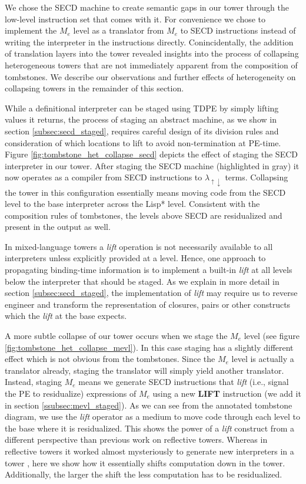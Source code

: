 \documentclass[a4paper,12pt,twoside,openright]{report}
\theoremstyle{definition}
\newcommand{\mslang}{$\lambda_{\uparrow\downarrow}$}
\newcommand{\mevl}{$M_{e}$}
\begin{document}
We chose the SECD machine to create semantic gaps in our tower through the low-level instruction set that comes with it. For convenience we chose to implement the \mevl{} level as a translator from \mevl{} to SECD instructions instead of writing the interpreter in the instructions directly. Conincidentally, the addition of translation layers into the tower revealed insights into the process of collapsing heterogeneous towers that are not immediately apparent from the composition of tombstones. We describe our observations and further effects of heterogeneity on collapsing towers in the remainder of this section.

While a definitional interpreter can be staged using TDPE by simply lifting values it returns, the process of staging an abstract machine, as we show in section \ref{subsec:secd_staged}, requires careful design of its division rules and consideration of which locations to lift to avoid non-termination at PE-time. Figure \ref{fig:tombstone_het_collapse_secd} depicts the effect of staging the SECD interpreter in our tower. After staging the SECD machine (highlighted in gray) it now operates as a compiler from SECD instructions to \mslang{} terms. Collapsing the tower in this configuration essentially means moving code from the SECD level to the base interpreter across the Lisp* level. Consistent with the composition rules of tombstones, the levels above SECD are residualized and present in the output as well.

In mixed-language towers a \textit{lift} operation is not necessarily available to all interpreters unless explicitly provided at a level. Hence, one approach to propagating binding-time information is to implement a built-in \textit{lift} at all levels below the interpreter that should be staged. As we explain in more detail in section \ref{subsec:secd_staged}, the implementation of \textit{lift} may require us to reverse engineer and transform the representation of closures, pairs or other constructs which the \textit{lift} at the base expects.

A more subtle collapse of our tower occurs when we stage the \mevl{} level (see figure \ref{fig:tombstone_het_collapse_mevl}). In this case staging has a slightly different effect which is not obvious from the tombstones. Since the \mevl{} level is actually a translator already, staging the translator will simply yield another translator. Instead, staging \mevl{} means we generate SECD instructions that \textit{lift} (i.e., signal the PE to residualize) expressions of \mevl{} using a new \textbf{LIFT} instruction (we add it in section \ref{ssubsec:mevl_staged}). As we can see from the annotated tombstone diagram, we use the \textit{lift} operator as a medium to move code through each level to the base where it is residualized. This shows the power of a \textit{lift} construct from a different perspective than previous work on reflective towers. Whereas in reflective towers it worked almost mysteriously to generate new interpreters in a tower \cite{danvy1988intensions}, here we show how it essentially shifts computation down in the tower. Additionally, the larger the shift the less computation has to be residualized.
\end{document}
